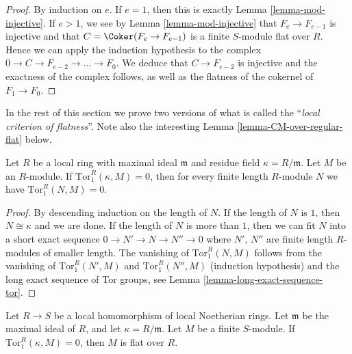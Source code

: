 \begin{proof}
By induction on $e$. If $e = 1$, then this is exactly
Lemma \ref{lemma-mod-injective}. If $e > 1$, we see
by Lemma \ref{lemma-mod-injective} that $F_e \to F_{e-1}$
is injective and that $C = \Coker(F_e \to F_{e-1})$
is a finite $S$-module flat over $R$. Hence we can
apply the induction hypothesis to the complex
$0 \to C \to F_{e-2} \to \ldots \to F_0$.
We deduce that $C \to F_{e-2}$ is injective
and the exactness of the complex follows, as well
as the flatness of the cokernel of $F_1 \to F_0$.
\end{proof}

\noindent
In the rest of this section we prove two versions of what is called the
``{\it local criterion of flatness}''. Note also the interesting
Lemma \ref{lemma-CM-over-regular-flat} below.

\begin{lemma}
\label{lemma-prepare-local-criterion-flatness}
Let $R$ be a local ring with maximal ideal $\mathfrak m$
and residue field $\kappa = R/\mathfrak m$.
Let $M$ be an $R$-module. If $\text{Tor}_1^R(\kappa, M) = 0$,
then for every finite length $R$-module $N$ we have
$\text{Tor}_1^R(N, M) = 0$.
\end{lemma}

\begin{proof}
By descending induction on the length of $N$.
If the length of $N$ is $1$, then $N \cong \kappa$
and we are done. If the length of $N$ is more than
$1$, then we can fit $N$ into a short exact sequence
$0 \to N' \to N \to N'' \to 0$ where $N'$, $N''$ are
finite length $R$-modules of smaller length.
The vanishing of $\text{Tor}_1^R(N, M)$ follows
from the vanishing of $\text{Tor}_1^R(N', M)$
and $\text{Tor}_1^R(N'', M)$ (induction hypothesis)
and the long exact sequence of Tor groups, see Lemma
\ref{lemma-long-exact-sequence-tor}.
\end{proof}

\begin{lemma}
\label{lemma-local-criterion-flatness}
Let $R \to S$ be a local homomorphism of local Noetherian
rings. Let $\mathfrak m$ be the maximal ideal of $R$,
and let $\kappa = R/\mathfrak m$.
Let $M$ be a finite $S$-module. If $\text{Tor}_1^R(\kappa, M) = 0$,
then $M$ is flat over $R$.
\end{lemma}

